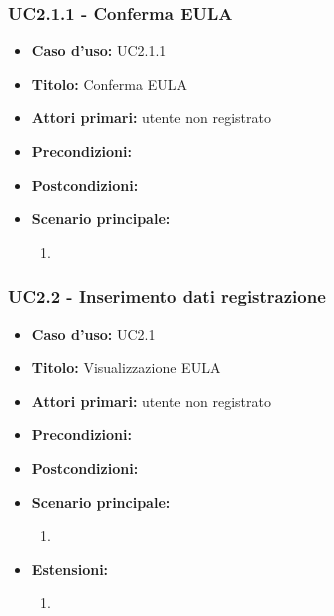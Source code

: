 \documentclass[casi-duso]{subfiles}
\begin{document}
\subsubsection{UC2.1.1 - Conferma EULA}
\label{subsub:uc2.1.1utente}
\begin{itemize}
  \item \textbf{Caso d’uso:} UC2.1.1 
  \item \textbf{Titolo:} Conferma EULA
  \item \textbf{Attori primari:} utente non registrato
  \item \textbf{Precondizioni:} 
  \item \textbf{Postcondizioni:}  
  \item \textbf{Scenario principale:} 
  \begin{enumerate}
    \item 
  \end{enumerate}    
\end{itemize}

\subsubsection{UC2.2 - Inserimento dati registrazione}
\label{subsub:uc2.2utente}
\begin{itemize}
  \item \textbf{Caso d’uso:} UC2.1 
  \item \textbf{Titolo:} Visualizzazione EULA
  \item \textbf{Attori primari:} utente non registrato
  \item \textbf{Precondizioni:} 
  \item \textbf{Postcondizioni:}  
  \item \textbf{Scenario principale:} 
  \begin{enumerate}
    \item 
  \end{enumerate}
  \item \textbf{Estensioni:} 
  \begin{enumerate}
    \item 
  \end{enumerate}     
\end{itemize}

\end{document}
